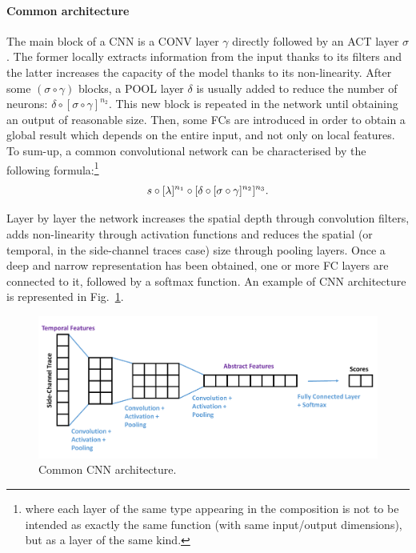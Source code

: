 \paragraph*{Common architecture}
The main block of a CNN is a CONV layer $\gamma$ directly followed by an ACT layer $\sigma$. The former locally extracts information from the input thanks to its filters and the latter increases the capacity of the model thanks to its non-linearity. After some $ ( \sigma \circ \gamma)$  blocks, a POOL layer $\delta$ is usually added to reduce the number of neurons: $\delta \circ [ \sigma\circ \gamma]^{n_2} $. This new block is repeated in the network until obtaining an output of reasonable size. Then, some FCs are introduced in order to obtain a global result which depends on the entire input, and not only on local features. To sum-up, a common convolutional network can be characterised by the following formula:\footnote{where each layer of the same type appearing in the composition is not to be intended as exactly the same function (\eg with same input/output dimensions), but as a layer of the same kind.} 
\begin{equation}\label{equ:CCN}
  s \circ [\lambda]^{n_1} \circ[\delta \circ [\sigma \circ \gamma  ]^{n_2} ]^{n_3}  .
\end{equation}

 Layer by layer the network increases the spatial depth through convolution filters, adds non-linearity through activation functions and reduces the spatial (or temporal, in the side-channel traces case) size through pooling layers. Once a deep and narrow representation has been obtained, one or more FC layers are connected to it, followed by a softmax function. An example of CNN architecture is represented in Fig.~\ref{fig:archi_conv}. 
\begin{figure}[h]
\centering
\includegraphics[width=\textwidth]{../Figures/CHES2017/convnet_arch.pdf}
\caption{Common CNN architecture.}
\label{fig:archi_conv}
\end{figure} 



